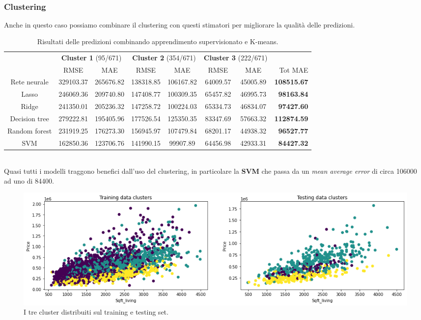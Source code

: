 \documentclass{article}
\begin{document}
\subsubsection{Clustering}
Anche in questo caso possiamo combinare il clustering con questi stimatori per
migliorare la qualità delle predizioni.
\begin{table}[ht]
	\small
	\centering
	\begin{tabular}{c|c|c|c|c|c|c|r|}
		\cline{2-8}
		& \multicolumn{2}{|c}{\textbf{Cluster 1} (95/671)}
		& \multicolumn{2}{|c|}{\textbf{Cluster 2} (354/671)}
		& \multicolumn{2}{c|}{\textbf{Cluster 3} (222/671)} & \\
		\cline{2-7}
		& RMSE & MAE & RMSE & MAE & RMSE & MAE & Tot MAE \\
		\hline
		\multicolumn{1}{|c|}{Rete neurale} & 329103.37 & 265676.82 & 138318.85
		& 106167.82 & 64009.57 & 45005.89 & \textbf{108515.67} \\
		\hline
		\multicolumn{1}{|c|}{Lasso} & 246069.36 & 209740.80 & 147408.77
		& 100309.35 & 65457.82 & 46995.73 & \textbf{98163.84} \\
		\hline
		\multicolumn{1}{|c|}{Ridge} & 241350.01 & 205236.32 & 147258.72
		& 100224.03 & 65334.73 & 46834.07 & \textbf{97427.60} \\
		\hline
		\multicolumn{1}{|c|}{Decision tree} & 279222.81 & 195405.96 & 177526.54
		& 125350.35 & 83347.69 & 57663.32 & \textbf{112874.59} \\
		\hline
		\multicolumn{1}{|c|}{Random forest} & 231919.25 & 176273.30 & 156945.97
		& 107479.84 & 68201.17 & 44938.32 & \textbf{96527.77} \\
		\hline
		\multicolumn{1}{|c|}{SVM} & 162850.36 & 123706.76 & 141990.15
		& 99907.89 & 64456.98 & 42933.31 & \textbf{84427.32} \\
		\hline
	\end{tabular}
	\caption{Risultati delle predizioni combinando apprendimento supervisionato
	e K-means.}
\end{table}
\\
Quasi tutti i modelli traggono benefici dall'uso del clustering, in particolare
la \textbf{SVM} che passa da un \textit{mean average error} di circa 106000 ad uno di
84400.
\begin{figure}[ht]
	\centering
	\includegraphics[width=\textwidth]{clusterdiff.png}
	\caption{I tre cluster distribuiti sul training e testing set.}
\end{figure}
\end{document}
